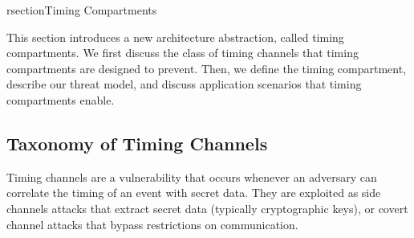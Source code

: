 rsection{Timing Compartments}

This section introduces a new architecture abstraction, called timing 
compartments.
We first discuss the class of timing channels that timing compartments are 
designed
to prevent.  Then, we define the timing compartment, describe our threat model,
and discuss application scenarios that timing compartments enable.


\subsection{Taxonomy of Timing Channels}


Timing channels are a vulnerability that occurs whenever an adversary can 
correlate the timing of an event with secret data.
They are exploited as side channels attacks that extract secret data (typically 
cryptographic keys), or covert channel attacks that bypass restrictions on 
communication.


